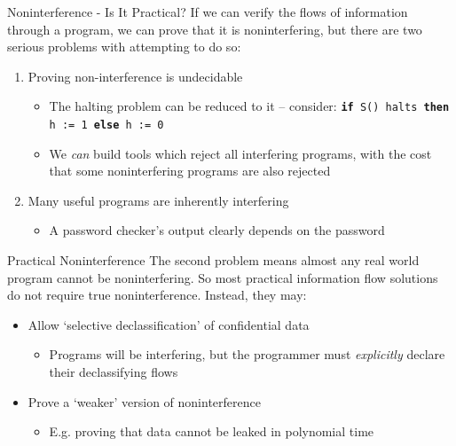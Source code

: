 \begin{frame}{Noninterference - Is It Practical?}
	If we can verify the flows of information through a program, we can prove that it is noninterfering, but there are two serious problems with attempting to do so:
	
	\begin{enumerate}
		\item Proving non-interference is undecidable
			\begin{itemize}
				\item The halting problem can be reduced to it -- consider: \newline \texttt{\textbf{if} S() halts \textbf{then} h := 1 \textbf{else} h := 0} \cite{ifbackground:denninghalting}
				\item We \textit{can} build tools which reject all interfering programs, with the cost that some noninterfering programs are also rejected 
			\end{itemize}
		\item Many useful programs are inherently interfering
			\begin{itemize}
				\item A password checker's output clearly depends on the password
			\end{itemize}
	\end{enumerate}
\end{frame}

\begin{frame}{Practical Noninterference}
	The second problem means almost any real world program cannot be noninterfering. So most practical information flow solutions do not require true noninterference. Instead, they may:
	
	\begin{itemize}
		\item Allow `selective declassification' of confidential data
		\begin{itemize}
			\item Programs will be interfering, but the programmer must \textit{explicitly} declare their declassifying flows
		\end{itemize}
		\item Prove a `weaker' version of noninterference
		\begin{itemize}
			\item E.g. proving that data cannot be leaked in polynomial time
		\end{itemize}
	\end{itemize}
\end{frame}

